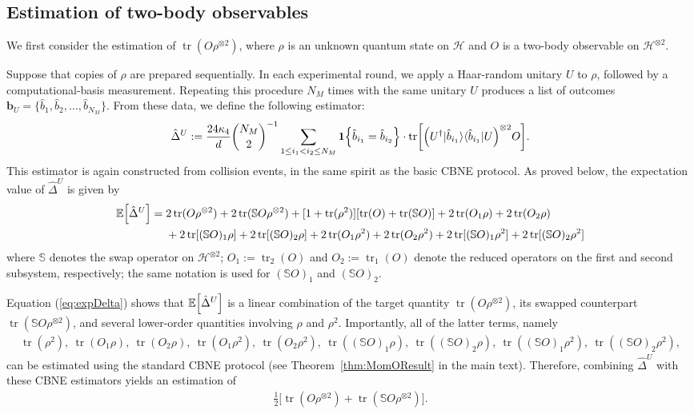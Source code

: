 \documentclass[aps,prl,twocolumn,nofootinbib,superscriptaddress,10pt]{revtex4-2}
\let\originalleft\left
\let\originalright\right
\renewcommand{\left}{\mathopen{}\mathclose\bgroup\originalleft}
\renewcommand{\right}{\aftergroup\egroup\originalright}
\def\E{ {\mathbb E} } %
\def\>{\rangle}
\def\<{\langle}
\DeclareMathOperator{\Tr}{tr}
\theoremstyle{plain}
\theoremstyle{definition}
\newcommand{\caH}{\mathcal{H}}
\def\eqref#1{\textup{(\ref{#1})}}
\begin{document}
\subsection{Estimation of two-body observables}
We first consider the estimation of $\Tr(O \rho^{\otimes 2})$, where $\rho$ is an unknown quantum state on $\caH$ and $O$ is a two-body observable on $\caH^{\otimes 2}$. 

Suppose that copies of $\rho$ are prepared sequentially. 
In each experimental round, we apply a Haar-random unitary $U$ to $\rho$, followed by a computational-basis measurement. 
Repeating this procedure $N_M$ times with the same unitary $U$ produces a list of outcomes
$\mathbf{b}_U=\{\hat b_1,\hat b_2,\dots,\hat b_{N_M}\}$. 
From these data, we define the following estimator:
\begin{align}\label{eq:defDelta}
\hat{\Delta}^{U}:=    
\frac{ 24\kappa_{4}}{d}  \binom{N_M}{2}^{-1}
\sum_{ 1\leq i_1 < i_2 \leq N_M} 
\textbf{1}\left\{\hat{b}_{i_1}=\hat{b}_{i_2}\right\} \cdot \Tr \left[ \left(U^{\dag}|\hat{b}_{i_1}\>\<\hat{b}_{i_1}|U\right)^{\otimes 2}O\right].    
\end{align}
This estimator is again constructed from collision events, in the same spirit as the basic CBNE protocol.
As proved below, the expectation value of $\hat{\Delta}^{U}$ is given by
\begin{align}\label{eq:expDelta}
\E \left[ \hat{\Delta}^{U} \right] 
&= 2 \Tr(O \rho^{\otimes 2}) + 2 \Tr(\mathbb{S}O \rho^{\otimes 2})+ [1+\Tr(\rho^2)] [\Tr(O) + \Tr(\mathbb{S}O)] + 2 \Tr(O_1\rho)+ 2 \Tr(O_2\rho)
\nonumber \\
&\quad\ 
+ 2 \Tr[(\mathbb{S}O)_1\rho]
+ 2 \Tr[(\mathbb{S}O)_2\rho] 
+ 2 \Tr(O_1\rho^2)+ 2 \Tr(O_2\rho^2) + 2 \Tr[(\mathbb{S}O)_1\rho^2] 
+ 2 \Tr[(\mathbb{S}O)_2\rho^2] 
\end{align}
where $\mathbb{S}$ denotes the swap operator on $\caH^{\otimes 2}$; 
$O_1:=\Tr_2(O)$ and $O_2:=\Tr_1(O)$
denote the reduced operators on the first and second subsystem, respectively; the same notation is used for $(\mathbb{S}O)_1$ and $(\mathbb{S}O)_2$.

Equation \eqref{eq:expDelta} shows that $\E \left[ \hat{\Delta}^{U} \right]$ is a linear combination of the target quantity $\Tr(O\rho^{\otimes 2})$, its swapped counterpart $\Tr(\mathbb{S}O\rho^{\otimes 2})$, and several lower-order quantities involving $\rho$ and $\rho^2$. 
Importantly, all of the latter terms, namely
\begin{align}
\Tr(\rho^2),\ 
\Tr(O_1\rho),\ \Tr(O_2\rho),\ 
\Tr(O_1\rho^2),\ \Tr(O_2\rho^2),\ 
\Tr((\mathbb{S}O)_1\rho),\ \Tr((\mathbb{S}O)_2\rho),\ 
\Tr((\mathbb{S}O)_1\rho^2),\ \Tr((\mathbb{S}O)_2\rho^2),
\end{align}
can be estimated using the standard CBNE protocol (see Theorem~\ref{thm:MomOResult} in the main text). 
Therefore, combining $\hat{\Delta}^{U}$ with these CBNE estimators yields an estimation of
\begin{align}\label{eq:sym_target}
\frac{1}{2}\Big[\Tr(O\rho^{\otimes 2})+\Tr(\mathbb{S}O\rho^{\otimes 2})\Big].
\end{align}
\end{document}
